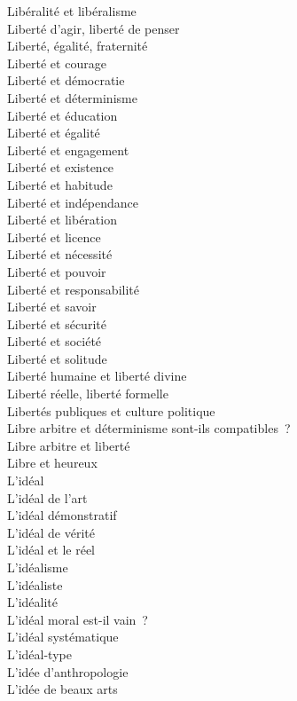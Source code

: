 \documentclass[a4paper,12pt]{article}
\begin{document}
Libéralité et libéralisme \\
Liberté d'agir, liberté de penser \\
Liberté, égalité, fraternité \\
Liberté et courage \\
Liberté et démocratie \\
Liberté et déterminisme \\
Liberté et éducation \\
Liberté et égalité \\
Liberté et engagement \\
Liberté et existence \\
Liberté et habitude \\
Liberté et indépendance \\
Liberté et libération \\
Liberté et licence \\
Liberté et nécessité \\
Liberté et pouvoir \\
Liberté et responsabilité \\
Liberté et savoir \\
Liberté et sécurité \\
Liberté et société \\
Liberté et solitude \\
Liberté humaine et liberté divine \\
Liberté réelle, liberté formelle \\
Libertés publiques et culture politique \\
Libre arbitre et déterminisme sont-ils compatibles ? \\
Libre arbitre et liberté \\
Libre et heureux \\
L'idéal \\
L'idéal de l'art \\
L'idéal démonstratif \\
L'idéal de vérité \\
L'idéal et le réel \\
L'idéalisme \\
L'idéaliste \\
L'idéalité \\
L'idéal moral est-il vain ? \\
L'idéal systématique \\
L'idéal-type \\
L'idée d'anthropologie \\
L'idée de beaux arts \\
\end{document}
